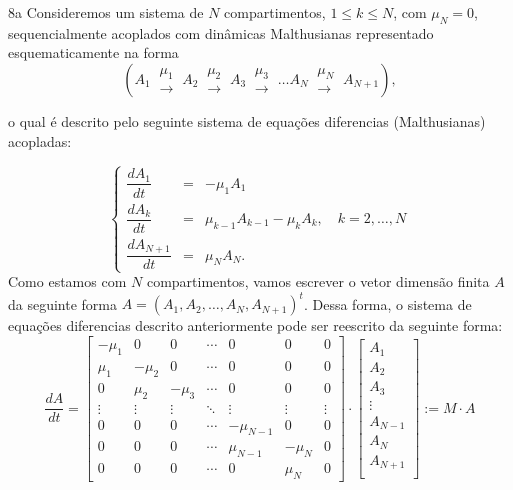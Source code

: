 8a Consideremos um sistema de \(N\) compartimentos, \(1 \le k \le N\), com \(\mu_N = 0\), sequencialmente acoplados com dinâmicas Malthusianas representado esquematicamente na forma
		\[(
		A_1 \ \substack{\mu_1 \\ \longrightarrow} \
		A_2 \ \substack{\mu_2 \\ \longrightarrow} \
		A_3 \ \substack{\mu_3 \\ \longrightarrow} \
		\ldots
		A_N \ \substack{\mu_N \\ \longrightarrow} \
		A_{N+1}),\]
		
		o qual é descrito pelo seguinte sistema de equações diferencias (Malthusianas) acopladas:
		
		\[ 
		\left\{ \begin{array}{rcl}
			
			\dfrac{dA_{1}}{dt} &=& -\mu_{1} A_{1} \\[0.3cm]
			\dfrac{dA_{k}}{dt} &=& \mu_{k-1} A_{k-1} - \mu_{k} A_{k},\quad k = 2, \ldots, N \\[0.3cm]
			\dfrac{dA_{N+1}}{dt} &=& \mu_{N} A_{N}.
		\end{array}\right.
		\]
		Como estamos com $N$ compartimentos, vamos escrever o vetor dimensão finita $A$ da seguinte forma $A = (A_1, A_2, \ldots, A_N, A_{N+1})^{t}$. Dessa forma, o sistema de equações diferencias descrito anteriormente pode ser reescrito da seguinte forma:
		\[\dfrac{dA}{dt}
		=\left[
		\begin{array}{ccccccc}
			-\mu_{1} & 0 & 0 & \cdots & 0 & 0 & 0 \\
			\mu_{1} & -\mu_{2} & 0 & \cdots & 0 & 0 & 0 \\
			0 & \mu_{2} & -\mu_{3} & \cdots & 0 & 0 & 0 \\
			\vdots & \vdots & \vdots & \ddots & \vdots & \vdots & \vdots \\
			0 & 0 & 0 & \cdots & -\mu_{N-1} & 0 & 0 \\
			0 & 0 & 0 & \cdots & \mu_{N-1} & -\mu_N  & 0 \\
			0 & 0 & 0 & \cdots & 0 & \mu_N  & 0
		\end{array}\right]
		\cdot
		\left[
		\begin{array}{c}
		A_1 \\
		A_2 \\
		A_3 \\
		\vdots \\
		A_{N-1} \\
		A_{N} \\
		A_{N+1} \\	
		\end{array}\right]
		:= M\cdot A
		\]
				
